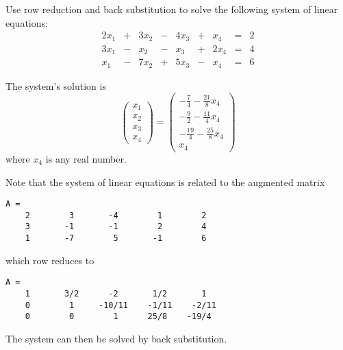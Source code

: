 \documentclass{ximera}
\begin{document}
\begin{computerExercise} \label{c2.3.3}
Use row reduction and back substitution to solve the following
system of linear equations:
\[
\begin{array}{rcrcrcrcr}
2x_1 & + &  3x_2 &  - &  4x_3 & + &  x_4 &  = & 2 \\
3x_1 & - &   x_2 &  - &   x_3 & + & 2x_4 &  = & 4 \\
 x_1 & - &  7x_2 &  + &  5x_3 & - &  x_4 &  = & 6
\end{array}
\]

\begin{solution}

\ans The system's solution is
\[
\left(\begin{array}{c} x_1 \\ x_2 \\ x_3 \\ x_4\end{array}\right) =
\left(\begin{array}{c} -\frac{7}{4} - \frac{21}{8}x_4 \\ -\frac{9}{2} -
\frac{11}{4}x_4 \\ -\frac{19}{4} - \frac{25}{8}x_4 \\ x_4\end{array}\right)
\]
where $x_4$ is any real number.

\soln Note that the system of linear equations is related to the
augmented matrix
\begin{verbatim}
A = 
    2        3       -4        1        2
    3       -1       -1        2        4
    1       -7        5       -1        6
\end{verbatim}
which row reduces to
\begin{verbatim}
A =
    1       3/2      -2       1/2       1
    0        1     -10/11    -1/11    -2/11
    0        0        1      25/8    -19/4
\end{verbatim}
The system can then be solved by back substitution.

\end{solution}
\end{computerExercise}
\end{document}

